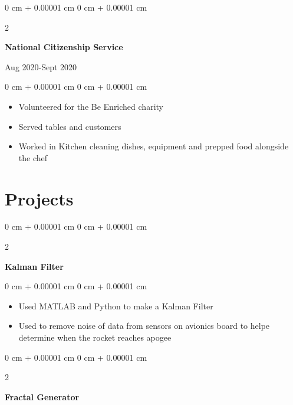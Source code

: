 \documentclass[10pt, letterpaper]{article}
\newenvironment{onecolentry}{
    \begin{adjustwidth}{
        0 cm + 0.00001 cm
    }{
        0 cm + 0.00001 cm
    }
}{
    \end{adjustwidth}
} %
\newenvironment{twocolentry}[2][]{
    \onecolentry
    \def\secondColumn{#2}
    \setcolumnwidth{\fill, 4.5 cm}
    \begin{paracol}{2}
}{
    \switchcolumn \raggedleft \secondColumn
    \end{paracol}
    \endonecolentry
} %
\begin{document}
\begin{samepage}
            \vspace{0.10 cm}

        \begin{twocolentry}{
                Aug 2020-Sept 2020
            }
                \textbf{National Citizenship Service}

                \vspace{0.10 cm}
            \end{twocolentry}


            \vspace{0.10 cm}

            \begin{onecolentry}
                \begin{itemize}
                    \item Volunteered for the Be Enriched charity
                    \item Served tables and customers
                    \item Worked in Kitchen cleaning dishes, equipment and prepped food alongside the chef
                \end{itemize}
            \end{onecolentry}
        
        \end{samepage}

    \section{Projects}

        \begin{twocolentry}{}
            \textbf{Kalman Filter}
        \end{twocolentry}

        \vspace{0.10 cm}
        \begin{onecolentry}
            \begin{itemize}
                \item Used MATLAB and Python to make a Kalman Filter
                \item Used to remove noise of data from sensors on avionics board to helpe determine when the rocket reaches apogee
            \end{itemize}
        \end{onecolentry}


        \vspace{0.2 cm}

        \begin{twocolentry}{}
            \textbf{Fractal Generator}
        \end{twocolentry}
\end{document}
